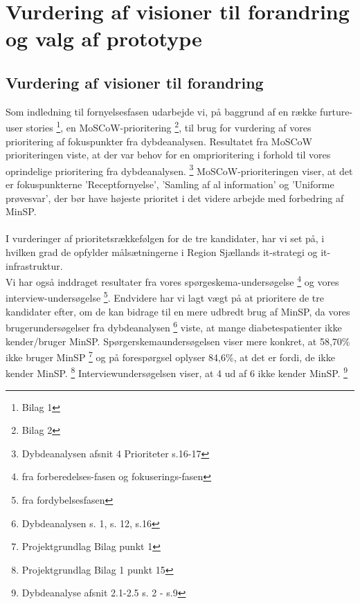 %
%
%
%
%
%
%
%
%
%
%
%
%
%
%
%
%
%
%
%
%
%
%
%
%
%
%
%
%
\section{Vurdering af visioner til forandring og valg af prototype}
\subsection{Vurdering af visioner til forandring}
Som indledning til fornyelsesfasen udarbejde vi, på baggrund af en række furture-user stories \footnote{Bilag 1}, en MoSCoW-prioritering \footnote{Bilag 2}, til brug for vurdering af vores prioritering af fokuspunkter fra dybdeanalysen.
Resultatet fra MoSCoW prioriteringen viste, at der var behov for en omprioritering i forhold til vores oprindelige prioritering fra dybdeanalysen. \footnote{Dybdeanalysen afsnit 4 Prioriteter s.16-17}
%
MoSCoW-prioriteringen viser, at det er fokuspunkterne 'Receptfornyelse', 'Samling af al information' og 'Uniforme prøvesvar', der bør have højeste prioritet i det videre arbejde med forbedring af MinSP.\\
\\
I vurderinger af prioritetsrækkefølgen for de tre kandidater, har vi set på, i hvilken grad de opfylder målsætningerne i Region Sjællands it-strategi og it-infrastruktur. \\
Vi har også inddraget resultater fra vores spørgeskema-undersøgelse \footnote{fra forberedelses-fasen og fokuserings-fasen} og vores interview-undersøgelse \footnote{fra fordybelsesfasen}.
Endvidere har vi lagt vægt på at prioritere de tre kandidater efter, om de kan bidrage til en mere udbredt brug af MinSP, da vores brugerundersøgelser fra dybdeanalysen \footnote{Dybdeanalysen s. 1, s. 12, s.16} viste, at mange diabetespatienter ikke kender/bruger MinSP. 
Spørgerskemaundersøgelsen viser mere konkret, at 58,70\% ikke bruger MinSP \footnote{Projektgrundlag Bilag punkt 1} og på forespørgsel oplyser 84,6\%, at det er fordi, de ikke kender MinSP. \footnote{Projektgrundlag Bilag 1 punkt 15} Interviewundersøgelsen viser, at 4 ud af 6 ikke kender MinSP. \footnote{Dybdeanalyse afsnit 2.1-2.5 s. 2 - s.9}\\
